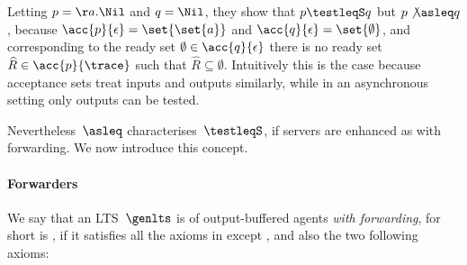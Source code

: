%
Letting $\serverA = \aa.\Nil$ and $\serverB = \Nil$, they show that
$\serverA \testleqS \serverB $ but $ \serverA \not \asleq \serverB$,
because $\acc{ \serverA }{ \epsilon } =\set{\set{a}}$ and
$\acc{ \serverB }{ \epsilon } =\set{\emptyset}$, and corresponding to
the ready set $\emptyset \in \acc{ \serverB }{ \epsilon }$ there is no
ready set $\widehat{R} \in \acc{ \serverA }{ \trace}$ such that
$\widehat{R} \subseteq \emptyset$. %
%
%
Intuitively this is the case because acceptance sets treat inputs and
outputs similarly, while in an asynchronous setting only outputs can
be tested.

Nevertheless~$\asleq$ characterises~$\testleqS$, if servers
are enhanced as with forwarding. We now introduce this concept.





\paragraph{Forwarders}
We say that an LTS~$\genlts$ is of output-buffered agents {\em with forwarding},
for short is \obaFW, if it satisfies all the axioms in
 except \outputfeedback, and also the two following axioms:%

